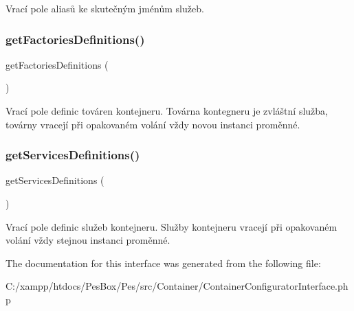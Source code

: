 Vrací pole aliasů ke skutečným jménům služeb. \mbox{\label{interface_pes_1_1_container_1_1_container_configurator_interface_afdc890d9a68d9d00590f47908f09ae45}} 
\subsubsection{\texorpdfstring{get\+Factories\+Definitions()}{getFactoriesDefinitions()}}
{\footnotesize\ttfamily get\+Factories\+Definitions (\begin{DoxyParamCaption}{ }\end{DoxyParamCaption})}

Vrací pole definic továren kontejneru. Továrna kontegneru je zvláštní služba, továrny vracejí při opakovaném volání vždy novou instanci proměnné. \mbox{\label{interface_pes_1_1_container_1_1_container_configurator_interface_ab659d0f399e0df92aac860b4927fc0d5}} 
\subsubsection{\texorpdfstring{get\+Services\+Definitions()}{getServicesDefinitions()}}
{\footnotesize\ttfamily get\+Services\+Definitions (\begin{DoxyParamCaption}{ }\end{DoxyParamCaption})}

Vrací pole definic služeb kontejneru. Služby kontejneru vracejí při opakovaném volání vždy stejnou instanci proměnné. 

The documentation for this interface was generated from the following file\+:\begin{DoxyCompactItemize}
\item 
C\+:/xampp/htdocs/\+Pes\+Box/\+Pes/src/\+Container/Container\+Configurator\+Interface.\+php\end{DoxyCompactItemize}
